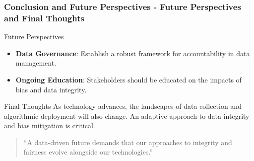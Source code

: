 \documentclass{beamer}
\begin{document}
\begin{frame}[fragile]
    \frametitle{Conclusion and Future Perspectives - Future Perspectives and Final Thoughts}

    \begin{block}{Future Perspectives}
        \begin{itemize}
            \item \textbf{Data Governance}: Establish a robust framework for accountability in data management.
            \item \textbf{Ongoing Education}: Stakeholders should be educated on the impacts of bias and data integrity.
        \end{itemize}
    \end{block}

    \begin{block}{Final Thoughts}
        As technology advances, the landscapes of data collection and algorithmic deployment will also change. An adaptive approach to data integrity and bias mitigation is critical.
    \end{block}

    \begin{quote}
        ``A data-driven future demands that our approaches to integrity and fairness evolve alongside our technologies.''
    \end{quote}
\end{frame}
\end{document}
